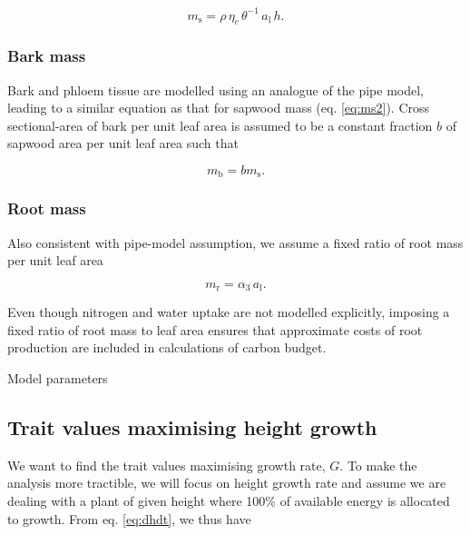 \documentclass[12pt, a4paper]{article}
\begin{document}
\begin{equation}\label{eq:ms2}
m_\textrm{s}=\rho \, \eta_c \, \theta^{-1} \, a_\textrm{l} \, h.
\end{equation}

\subsubsection{Bark mass}\label{bark-mass}

Bark and phloem tissue are modelled using an analogue of the pipe model,
leading to a similar equation as that for sapwood mass (eq.
\ref{eq:ms2}). Cross sectional-area of bark per unit leaf area is
assumed to be a constant fraction \(b\) of sapwood area per unit leaf
area such that

\begin{equation}\label{eq:mb}
m_\textrm{b}=b m_\textrm{s}.
\end{equation}

\subsubsection{Root mass}\label{root-mass}

Also consistent with pipe-model assumption, we assume a fixed ratio of
root mass per unit leaf area

\begin{equation}\label{eq:mr}
m_\textrm{r}=\alpha_3 \, a_\textrm{l}.
\end{equation}

Even though nitrogen and water uptake are not modelled explicitly,
imposing a fixed ratio of root mass to leaf area ensures that
approximate costs of root production are included in calculations of
carbon budget.

\newpage

\begin{table}[h]
\caption{Model parameters}
\centering



\label{tab:params}
\end{table}

\subsection{Trait values maximising height
growth}\label{trait-values-maximising-height-growth}

We want to find the trait values maximising growth rate, \(G\). To make
the analysis more tractible, we will focus on height growth rate and
assume we are dealing with a plant of given height where 100\% of
available energy is allocated to growth. From eq. \ref{eq:dhdt}, we thus
have
\end{document}
